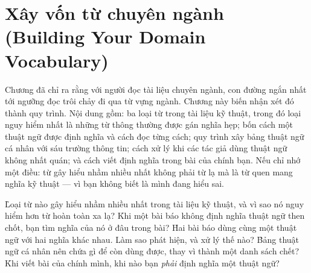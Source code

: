 \documentclass[../../english.tex]{subfiles}
\begin{document}
\chapter{Xây vốn từ chuyên ngành (Building Your Domain Vocabulary)}

\begin{tomtat}
Chương  đã chỉ ra rằng với người đọc tài liệu chuyên ngành, con đường ngắn nhất tới ngưỡng đọc trôi chảy đi qua từ vựng ngành. Chương này biến nhận xét đó thành quy trình. Nội dung gồm: ba loại từ trong tài liệu kỹ thuật, trong đó loại nguy hiểm nhất là những từ thông thường được gán nghĩa hẹp; bốn cách một thuật ngữ được định nghĩa và cách đọc từng cách; quy trình xây bảng thuật ngữ cá nhân với sáu trường thông tin; cách xử lý khi các tác giả dùng thuật ngữ không nhất quán; và cách viết định nghĩa trong bài của chính bạn. Nếu chỉ nhớ một điều: từ gây hiểu nhầm nhiều nhất không phải từ lạ mà là từ quen mang nghĩa kỹ thuật --- vì bạn không biết là mình đang hiểu sai.
\end{tomtat}

\begin{nentang}
\end{nentang}

\begin{khoigoi}
\h{Loại từ nào gây hiểu nhầm nhiều nhất trong tài liệu kỹ thuật, và vì sao nó nguy hiểm hơn từ hoàn toàn xa lạ?}
\h{Khi một bài báo không định nghĩa thuật ngữ then chốt, bạn tìm nghĩa của nó ở đâu trong bài?}
\h{Hai bài báo dùng cùng một thuật ngữ với hai nghĩa khác nhau. Làm sao phát hiện, và xử lý thế nào?}
\h{Bảng thuật ngữ cá nhân nên chứa gì để còn dùng được, thay vì thành một danh sách chết?}
\h{Khi viết bài của chính mình, khi nào bạn \emph{phải} định nghĩa một thuật ngữ?}
\end{khoigoi}
\end{document}
